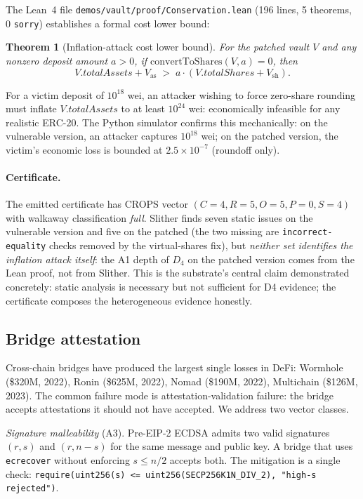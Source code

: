 \documentclass[11pt,a4paper]{article}
\newtheorem{theorem}{Theorem}
\begin{document}
The Lean~4 file \texttt{demos/vault/proof/Conservation.lean} (196 lines, 5 theorems, 0 \texttt{sorry}) establishes a formal cost lower bound:
\begin{theorem}[Inflation-attack cost lower bound]\label{thm:inflation-bound}
For the patched vault $V$ and any nonzero deposit amount $a > 0$, if $\mathrm{convertToShares}(V, a) = 0$, then
\[
V.\mathit{totalAssets} + V_{\mathrm{as}} \;>\; a \cdot (V.\mathit{totalShares} + V_{\mathrm{sh}}).
\]
\end{theorem}

\noindent For a victim deposit of $10^{18}$ wei, an attacker wishing to force zero-share rounding must inflate $V.\mathit{totalAssets}$ to at least $10^{24}$ wei: economically infeasible for any realistic ERC-20. The Python simulator confirms this mechanically: on the vulnerable version, an attacker captures $10^{18}$ wei; on the patched version, the victim's economic loss is bounded at $2.5 \times 10^{-7}$ (roundoff only).

\paragraph{Certificate.} The emitted certificate has CROPS vector $(C{=}4, R{=}5, O{=}5, P{=}0, S{=}4)$ with walkaway classification \emph{full}. Slither finds seven static issues on the vulnerable version and five on the patched (the two missing are \texttt{incorrect-equality} checks removed by the virtual-shares fix), but \emph{neither set identifies the inflation attack itself}: the A1 depth of $D_4$ on the patched version comes from the Lean proof, not from Slither. This is the substrate's central claim demonstrated concretely: static analysis is necessary but not sufficient for D4 evidence; the certificate composes the heterogeneous evidence honestly.

\subsection{Bridge attestation}\label{ssec:demo-bridge}

Cross-chain bridges have produced the largest single losses in DeFi: Wormhole (\$320M, 2022), Ronin (\$625M, 2022), Nomad (\$190M, 2022), Multichain (\$126M, 2023). The common failure mode is attestation-validation failure: the bridge accepts attestations it should not have accepted. We address two vector classes.

\emph{Signature malleability} (A3). Pre-EIP-2 ECDSA admits two valid signatures $(r,s)$ and $(r, n-s)$ for the same message and public key. A bridge that uses \texttt{ecrecover} without enforcing $s \le n/2$ accepts both. The mitigation is a single check: \texttt{require(uint256(s) <= uint256(SECP256K1N\_DIV\_2), "high-s rejected")}.
\end{document}
